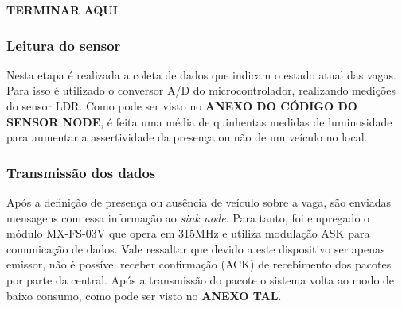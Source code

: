 \documentclass[oneside,openright,12pt]{ufsm_2015} %
\begin{document}
    
    
    
    
    
    \textbf{TERMINAR AQUI}
    
    \subsubsection{Leitura do sensor}
    Nesta etapa é realizada a coleta de dados que indicam o estado atual das vagas. Para isso é utilizado o conversor A/D do microcontrolador, realizando medições do sensor LDR. Como pode ser visto no \textbf{ANEXO DO CÓDIGO DO SENSOR NODE}, é feita uma média de quinhentas medidas de luminosidade para aumentar a assertividade da presença ou não de um veículo no local.
    
    \subsubsection{Transmissão dos dados}
    Após a definição de presença ou ausência de veículo sobre a vaga, são enviadas mensagens com essa informação ao \textit{sink node}. Para tanto, foi empregado o módulo MX-FS-03V que opera em 315MHz e utiliza modulação ASK para comunicação de dados. Vale ressaltar que devido a este dispositivo ser apenas emissor, não é possível receber confirmação (ACK) de recebimento dos pacotes por parte da central. Após a transmissão do pacote o sistema volta ao modo de baixo consumo, como pode ser visto no \textbf{ANEXO TAL}.
    
    
\end{document}
